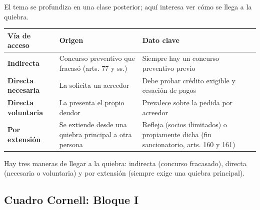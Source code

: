 \documentclass[12pt,oneside]{book}
\begin{document}
El tema se profundiza en una clase posterior; aquí interesa ver cómo se llega a la quiebra.

\begin{table}[H]
\centering
\small
\begin{tabularx}{\textwidth}{>{\raggedright\arraybackslash}p{} >{\raggedright\arraybackslash}X >{\raggedright\arraybackslash}X}
\toprule
\textbf{Vía de acceso} & \textbf{Origen} & \textbf{Dato clave} \\
\midrule
\textbf{Indirecta} & Concurso preventivo que fracasó (arts. 77 y ss.) & Siempre hay un concurso preventivo previo \\
\textbf{Directa necesaria} & La solicita un acreedor & Debe probar crédito exigible y cesación de pagos \\
\textbf{Directa voluntaria} & La presenta el propio deudor & Prevalece sobre la pedida por acreedor \\
\textbf{Por extensión} & Se extiende desde una quiebra principal a otra persona & Refleja (socios ilimitados) o propiamente dicha (fin sancionatorio, arts. 160 y 161) \\
\bottomrule
\end{tabularx}
\end{table}

\begin{important}
Hay tres maneras de llegar a la quiebra: indirecta (concurso fracasado), directa (necesaria o voluntaria) y por extensión (siempre exige una quiebra principal).
\end{important}

\subsection*{Cuadro Cornell: Bloque I}
\end{document}
